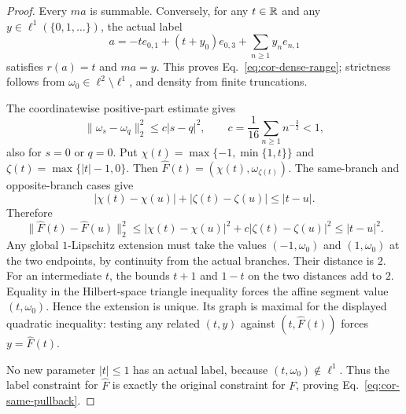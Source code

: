 \begin{proof}
Every $ma$ is summable. Conversely, for any $t\in\mathbb R$ and any
$y\in\ell^1(\{0,1,\ldots\})$, the actual label
\[
a=-t e_{0,1}+(t+y_0)e_{0,3}+\sum_{n\ge1}y_n e_{n,1}
\]
satisfies $r(a)=t$ and $ma=y$. This proves
Eq.~\eqref{eq:cor-dense-range}; strictness follows from
$\omega_0\in\ell^2\setminus\ell^1$, and density from finite truncations.

The coordinatewise positive-part estimate gives
\[
\|\omega_s-\omega_q\|_2^2\le c|s-q|^2,\qquad
c=\frac1{16}\sum_{n\ge1}n^{-\frac{3}{2}}<1,
\]
also for $s=0$ or $q=0$. Put $\chi(t)=\max\{-1,\min\{1,t\}\}$ and
$\zeta(t)=\max\{|t|-1,0\}$. Then
$\widehat F(t)=(\chi(t),\omega_{\zeta(t)})$.
The same-branch and opposite-branch cases give
\[
|\chi(t)-\chi(u)|+|\zeta(t)-\zeta(u)|\le|t-u|.
\]
Therefore
\[
\|\widehat F(t)-\widehat F(u)\|_2^2
\le|\chi(t)-\chi(u)|^2+c|\zeta(t)-\zeta(u)|^2
\le|t-u|^2.
\]
Any global $1$-Lipschitz extension must take the values
$(-1,\omega_0)$ and $(1,\omega_0)$ at the two endpoints, by
continuity from the actual branches. Their distance is $2$.
For an intermediate $t$, the bounds $t+1$ and $1-t$ on the two
distances add to $2$. Equality in the Hilbert-space triangle inequality
forces the affine segment value $(t,\omega_0)$. Hence the extension
is unique. Its graph is maximal for the displayed quadratic inequality:
testing any related $(t,y)$ against $(t,\widehat F(t))$ forces
$y=\widehat F(t)$.

No new parameter $|t|\le1$ has an actual label, because
$(t,\omega_0)\notin\ell^1$. Thus the label constraint for
$\widehat F$ is exactly the original constraint for $F$, proving
Eq.~\eqref{eq:cor-same-pullback}.


\end{proof}
